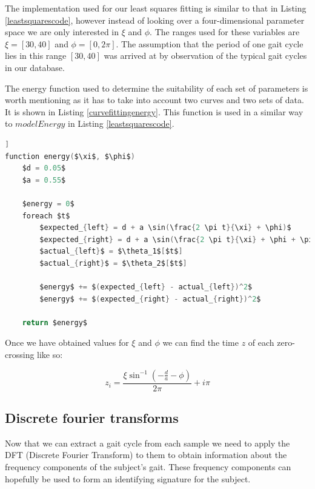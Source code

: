 The implementation used for our least squares fitting is similar to that in Listing \ref{leastsquarescode}, however instead of looking over a four-dimensional parameter space we are only interested in $\xi$ and $\phi$.
The ranges used for these variables are $\xi = [30, 40]$ and $\phi = [0, 2\pi]$.
The assumption that the period of one gait cycle lies in this range $[30, 40]$ was arrived at by observation of the typical gait cycles in our database.

The energy function used to determine the suitability of each set of parameters is worth mentioning as it has to take into account two curves and two sets of data.
It is shown in Listing \ref{curvefittingenergy}.
This function is used in a similar way to $modelEnergy$ in Listing \ref{leastsquarescode}.

\begin{lstlisting}[firstnumber=1,language=c,morekeywords={step,function,foreach,in},frame=single,mathescape=true,caption={Energy function pseudo-code},label={curvefittingenergy},float=[tb]]
function energy($\xi$, $\phi$)
	$d = 0.05$
	$a = 0.55$
	
	$energy = 0$
	foreach $t$
		$expected_{left} = d + a \sin(\frac{2 \pi t}{\xi} + \phi)$
		$expected_{right} = d + a \sin(\frac{2 \pi t}{\xi} + \phi + \pi)$
		$actual_{left}$ = $\theta_1$[$t$]
		$actual_{right}$ = $\theta_2$[$t$]
		
		$energy$ += $(expected_{left} - actual_{left})^2$
		$energy$ += $(expected_{right} - actual_{right})^2$
	
	return $energy$
\end{lstlisting}

Once we have obtained values for $\xi$ and $\phi$ we can find the time $z$ of each zero-crossing like so:

\begin{equation}
	z_i = \frac{\xi \sin^{-1}\left(-\frac{d}{a} - \phi\right)}{2\pi} + i\pi
\end{equation}


\subsection{Discrete fourier transforms}

Now that we can extract a gait cycle from each sample we need to apply the DFT (Discrete Fourier Transform) to them to obtain information about the frequency components of the subject's gait.
These frequency components can hopefully be used to form an identifying signature for the subject.

